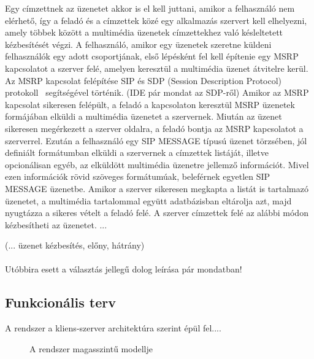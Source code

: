 Egy címzettnek az üzenetet akkor is el kell juttani, amikor a felhasználó nem elérhető, így a feladó és a címzettek közé egy alkalmazás szervert kell elhelyezni, amely többek között a multimédia üzenetek címzettekhez való késleltetett kézbesítését végzi. A felhasználó, amikor egy üzenetek szeretne küldeni felhasználók egy adott csoportjának, első lépésként fel kell építenie egy MSRP kapcsolatot a szerver felé, amelyen keresztül a multimédia üzenet átvitelre kerül. Az MSRP kapcsolat felépítése SIP és SDP (Session Description Protocol) protokoll~\cite{rfc4566} segítségével történik. {\color{red} (IDE pár mondat az SDP-ről)} Amikor az MSRP kapcsolat sikeresen felépült, a feladó a kapcsolaton keresztül MSRP üzenetek formájában elküldi a multimédia üzenetet a szervernek. Miután az üzenet sikeresen megérkezett a szerver oldalra, a feladó bontja az MSRP kapcsolatot a szerverrel. Ezután a felhasználó egy SIP MESSAGE típusú üzenet törzsében, jól definiált formátumban elküldi a szervernek a címzettek listáját, illetve opcionálisan egyéb, az elküldött multimédia üzenetre jellemző információt. Mivel ezen információk rövid szöveges formátumúak, beleférnek egyetlen SIP MESSAGE üzenetbe. Amikor a szerver sikeresen megkapta a listát is tartalmazó üzenetet, a multimédia tartalommal együtt adatbázisban eltárolja azt, majd nyugtázza a sikeres vételt a feladó felé. A szerver címzettek felé az alábbi módon kézbesítheti az üzenetet. ...

{\color{red} (... üzenet kézbesítés, előny, hátrány)}
\\
\\
{\color{red}Utóbbira esett a választás jellegű dolog leírása pár mondatban!}

\subsection{Funkcionális terv}

A rendszer a kliens-szerver architektúra szerint épül fel....

\begin{figure}[htbp]
\center
{}
\caption{A rendszer magasszintű modellje}
\label{fig:model}
\end{figure}



